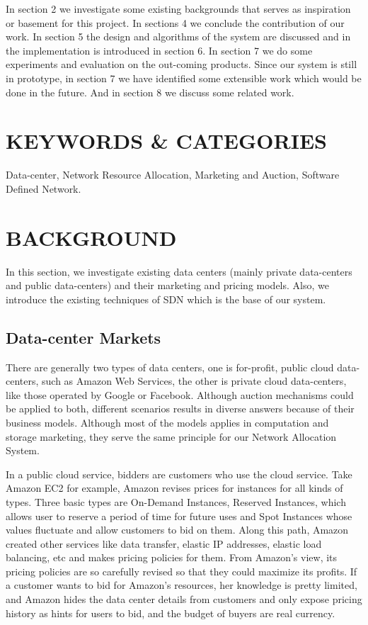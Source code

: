 \documentclass[a4paper,11pt,twocolumn]{article}
\begin{document}
In section 2 we investigate some existing backgrounds that serves as inspiration or basement for this project. In sections 4 we conclude the contribution  of our work. 
In section 5 the design and algorithms of the system are discussed and in the implementation is introduced in section 6. In section 7 we do some 
experiments and evaluation on the out-coming products. Since our system is still in prototype, in section 7 we have identified some extensible
work which would be done in the future. And in section 8 we discuss some related work.


\section{KEYWORDS \& CATEGORIES}
Data-center, Network Resource Allocation, Marketing and Auction, Software Defined Network.



\section{BACKGROUND}
In this section, we investigate     existing data centers (mainly private data-centers and public data-centers) and their marketing and 
pricing models. Also, we introduce the existing techniques of SDN which is the base of our system.
\subsection{Data-center Markets}
There are generally two types of data centers, one is for-profit, public cloud data-centers, such as Amazon Web Services\cite{aws}, the other is private cloud
data-centers, like those operated by Google or Facebook. Although auction mechanisms could be applied to both, different scenarios results in diverse answers because of 
their business models.  Although most of the models applies in computation and storage marketing, they serve the same principle for our Network Allocation System.

In a public cloud service, bidders are customers who use the cloud service. Take Amazon EC2 for example\cite{ec2}, Amazon revises prices for instances for all kinds
of types. Three basic types are On-Demand Instances, Reserved Instances, which allows user to reserve a period of time for future uses and Spot Instances\cite{spot} whose values 
fluctuate and allow customers to bid on them. Along this path, Amazon created other services like data transfer, elastic IP addresses, elastic load balancing, etc and 
makes pricing policies for them. From Amazon's view, its pricing policies are so carefully revised so that they could maximize its profits. If a customer wants to bid for Amazon's 
resources, her knowledge is pretty limited, and Amazon hides the data center details from customers and only expose pricing history as hints for users to bid, and the budget
of buyers are real currency. 
\end{document}
